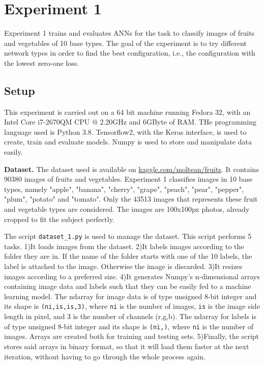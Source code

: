 \section{Experiment 1}
\label{sec:exp1}
Experiment 1 trains and evaluates ANNs for the task to classify images of fruits and vegetables of 10 base types. The goal of the experiment is to try different network types in order to find the best configuration, i.e., the configuration with the lowest zero-one loss.

\subsection{Setup}
This experiment is carried out on a 64 bit machine running Fedora 32, with an Intel\textsuperscript{\textregistered} Core\texttrademark{} i7-2670QM CPU @ 2.20GHz and 6GByte of RAM. THe programming language used is Python 3.8\cite{python3}. Tensorflow2\cite{tensorflow2015-whitepaper}, with the Keras\cite{chollet2015keras} interface, is used to create, train and evaluate models. Numpy\cite{harris2020array} is used to store and manipulate data easily.

\textbf{Dataset.}
The dataset used is available on \href{https://www.kaggle.com/moltean/fruits}{kaggle.com/moltean/fruits}. It contains 90380 images of fruits and vegetables. Experiment 1 classifies images in 10 base types, namely "apple", "banana", "cherry", "grape", "peach", "pear", "pepper", "plum", "potato" and "tomato". Only the 43513 images that represents these fruit and vegetable types are considered. The images are 100x100px photos, already cropped to fit the subject perfectly.

The script \texttt{dataset\_1.py} is used to manage the dataset. This script performs 5 tasks. 1)It loads images from the dataset. 2)It labels images according to the folder they are in. If the name of the folder starts with one of the 10 labels, the label is attached to the image. Otherwise the image is discarded. 3)It resizes images according to a preferred size. 4)It generates Numpy's n-dimensional arrays containing image data and labels such that they can be easily fed to a machine learning model. The ndarray for image data is of type unsigned 8-bit integer and its shape is \texttt{(ni,is,is,3)}, where \texttt{ni} is the number of images, \texttt{is} is the image side length in pixel, and 3 is the number of channels (r,g,b). The ndarray for labels is of type unsigned 8-bit integer and its shape is \texttt{(ni,)}, where \texttt{ni} is the number of images. Arrays are created both for training and testing sets. 5)Finally, the script stores said arrays in binary format, so that it will load them faster at the next iteration, without having to go through the whole process again.

